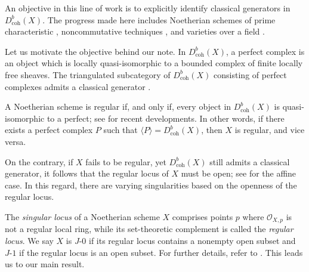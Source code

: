 \documentclass[11pt]{amsart}
\theoremstyle{plain}
\theoremstyle{definition}
\numberwithin{equation}{section}
\numberwithin{theorem}{section}
\begin{document}
An objective in this line of work is to explicitly identify classical generators in $D^b_{\operatorname{coh}}(X)$. The progress made here includes Noetherian schemes of prime characteristic \cite{BILMP:2023}, noncommutative techniques \cite{Bhaduri/Dey/Lank:2024}, and varieties over a field \cite{Rouquier:2008, Hanlon/Hicks/Lazarev:2023, Hanlon/Hicks:2023, Favero/Huang:2023, Pirozhkov:2023, Brown/Erman:2023, Lank/Olander:2024, Lank:2023}.

Let us motivate the objective behind our note. In $D^b_{\operatorname{coh}}(X)$, a perfect complex is an object which is locally quasi-isomorphic to a bounded complex of finite locally free sheaves. The triangulated subcategory of $D^b_{\operatorname{coh}}(X)$ consisting of perfect complexes admits a classical generator \cite{BVdB:2003}. 

A Noetherian scheme is regular if, and only if, every object in $D^b_{\operatorname{coh}}(X)$ is quasi-isomorphic to a perfect; see \cite{Neeman:2021} for recent developments. In other words, if there exists a perfect complex $P$ such that $\langle P \rangle = D^b_{\operatorname{coh}}(X)$, then $X$ is regular, and vice versa.

On the contrary, if $X$ fails to be regular, yet $D^b_{\operatorname{coh}}(X)$ still admits a classical generator, it follows that the regular locus of $X$ must be open; see \cite[Lemma 2.6]{Iyengar/Takahashi:2019} for the affine case. In this regard, there are varying singularities based on the openness of the regular locus.

The \textit{singular locus} of a Noetherian scheme $X$ comprises points $p$ where $\mathcal{O}_{X,p}$ is not a regular local ring, while its set-theoretic complement is called the \textit{regular locus}. We say $X$ is $J\textrm{-}0$ if its regular locus contains a nonempty open subset and $J\textrm{-}1$ if the regular locus is an open subset. For further details, refer to . This leads us to our main result.
\end{document}
